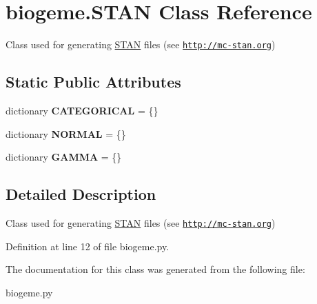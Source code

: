 \hypertarget{classbiogeme_1_1_s_t_a_n}{}\section{biogeme.\+S\+T\+AN Class Reference}
\label{classbiogeme_1_1_s_t_a_n}


Class used for generating \hyperlink{classbiogeme_1_1_s_t_a_n}{S\+T\+AN} files (see \href{http://mc-stan.org}{\tt http\+://mc-\/stan.\+org})  


\subsection*{Static Public Attributes}
\begin{DoxyCompactItemize}
\item 
dictionary {\bfseries C\+A\+T\+E\+G\+O\+R\+I\+C\+AL} = \{\}\hypertarget{classbiogeme_1_1_s_t_a_n_a7ed7a32656bee158d6e14f14c4a58f34}{}\label{classbiogeme_1_1_s_t_a_n_a7ed7a32656bee158d6e14f14c4a58f34}

\item 
dictionary {\bfseries N\+O\+R\+M\+AL} = \{\}\hypertarget{classbiogeme_1_1_s_t_a_n_a40628c7d1fd06ae17b1d733dedada458}{}\label{classbiogeme_1_1_s_t_a_n_a40628c7d1fd06ae17b1d733dedada458}

\item 
dictionary {\bfseries G\+A\+M\+MA} = \{\}\hypertarget{classbiogeme_1_1_s_t_a_n_a674af8e0ab65b0020a6e51d2aed78fbe}{}\label{classbiogeme_1_1_s_t_a_n_a674af8e0ab65b0020a6e51d2aed78fbe}

\end{DoxyCompactItemize}


\subsection{Detailed Description}
Class used for generating \hyperlink{classbiogeme_1_1_s_t_a_n}{S\+T\+AN} files (see \href{http://mc-stan.org}{\tt http\+://mc-\/stan.\+org}) 

Definition at line 12 of file biogeme.\+py.



The documentation for this class was generated from the following file\+:\begin{DoxyCompactItemize}
\item 
biogeme.\+py\end{DoxyCompactItemize}
